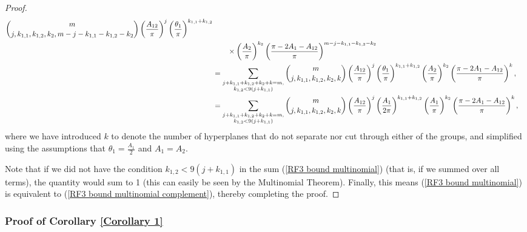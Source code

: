 \documentclass[twoside,11pt]{article}
\begin{document}
\begin{proof}
\begin{align}
{}
 \binom{m}{j,k_{1,1},k_{1,2},k_2,m-j-k_{1,1}-k_{1,2}-k_2} \left(\frac{A_{12}}{\pi}\right)^j \left(\frac{\theta_1}{\pi} \right)^{k_{1,1}+k_{1,2}} \notag\\
&\quad\quad \times  \left(\frac{A_2}{\pi} \right)^{k_2} \left(\frac{\pi-2A_1-A_{12}}{\pi}\right)^{m-j-k_{1,1}-k_{1,2}-k_2} \\
&= \sum_{\substack{j+k_{1,1}+k_{1,2}+k_2 + k = m, \\ k_{1,2} < 9(j+k_{1,1})}}
\binom{m}{j,k_{1,1},k_{1,2},k_2,k} \left(\frac{A_{12}}{\pi}\right)^j \left(\frac{\theta_1}{\pi} \right)^{k_{1,1}+k_{1,2}}   \left(\frac{A_2}{\pi} \right)^{k_2} \left(\frac{\pi-2A_1-A_{12}}{\pi}\right)^k, \\
&= %
\sum_{\substack{j+k_{1,1}+k_{1,2}+k_2 + k = m, \\ k_{1,2} < 9(j+k_{1,1})}}\binom{m}{j,k_{1,1},k_{1,2},k_2,k} \left(\frac{A_{12}}{\pi}\right)^j \left(\frac{A_1}{2\pi} \right)^{k_{1,1}+k_{1,2}}   \left(\frac{A_1}{\pi} \right)^{k_2} \left(\frac{\pi-2A_1-A_{12}}{\pi}\right)^k, \label{RF3 bound multinomial}
\end{align}
where we have introduced $k$ to denote the number of hyperplanes that do not separate nor cut through either of the groups, and simplified using the assumptions that $\theta_1 = \frac{A_1}{2}$ and $A_1 = A_2$. 

Note that if we did not have the condition $k_{1,2} < 9(j+k_{1,1})$ in the sum (\ref{RF3 bound multinomial}) (that is, if we summed over all terms), the quantity would sum to 1 (this can easily be seen by the Multinomial Theorem). Finally, this means (\ref{RF3 bound multinomial}) is equivalent to (\ref{RF3 bound multinomial complement}), thereby completing the proof.
\end{proof}

\subsubsection{Proof of Corollary \ref{Corollary 1}}
\end{document}
